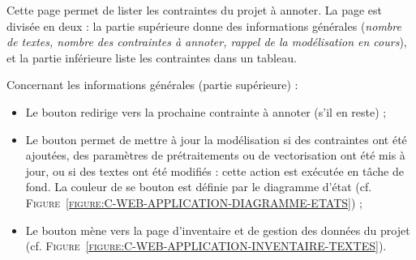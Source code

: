 		Cette page permet de lister les contraintes du projet à annoter.
		La page est divisée en deux : la partie supérieure donne des informations générales (\textit{nombre de textes, nombre des contraintes à annoter, rappel de la modélisation en cours}), et la partie inférieure liste les contraintes dans un tableau.
		
		Concernant les informations générales (partie supérieure) :
		\begin{itemize}
			\item Le bouton  redirige vers la prochaine contrainte à annoter (s'il en reste) ;
			\item Le bouton  permet de mettre à jour la modélisation si des contraintes ont été ajoutées, des paramètres de prétraitements ou de vectorisation ont été mis à jour, ou si des textes ont été modifiés : cette action est exécutée en tâche de fond.
			La couleur de se bouton est définie par le diagramme d'état (cf. \textsc{Figure~\ref{figure:C-WEB-APPLICATION-DIAGRAMME-ETATS}}) ;
			\item Le bouton  mène vers la page d'inventaire et de gestion des données du projet (cf. \textsc{Figure~\ref{figure:C-WEB-APPLICATION-INVENTAIRE-TEXTES}}).
		\end{itemize}
		
